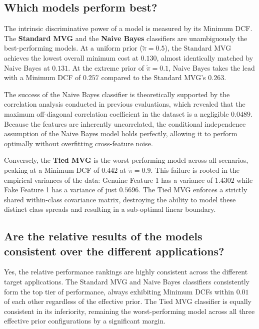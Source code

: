 \subsection*{Which models perform best?}

The intrinsic discriminative power of a model is measured by its Minimum DCF. The \textbf{Standard MVG} and the \textbf{Naive Bayes} classifiers are unambiguously the best-performing models. At a uniform prior ($\tilde{\pi} = 0.5$), the Standard MVG achieves the lowest overall minimum cost at $0.130$, almost identically matched by Naive Bayes at $0.131$. At the extreme prior of $\tilde{\pi} = 0.1$, Naive Bayes takes the lead with a Minimum DCF of $0.257$ compared to the Standard MVG's $0.263$. 

The success of the Naive Bayes classifier is theoretically supported by the correlation analysis conducted in previous evaluations, which revealed that the maximum off-diagonal correlation coefficient in the dataset is a negligible $0.0489$. Because the features are inherently uncorrelated, the conditional independence assumption of the Naive Bayes model holds perfectly, allowing it to perform optimally without overfitting cross-feature noise.

Conversely, the \textbf{Tied MVG} is the worst-performing model across all scenarios, peaking at a Minimum DCF of $0.442$ at $\tilde{\pi} = 0.9$. This failure is rooted in the empirical variances of the data: Genuine Feature 1 has a variance of $1.4302$ while Fake Feature 1 has a variance of just $0.5696$. The Tied MVG enforces a strictly shared within-class covariance matrix, destroying the ability to model these distinct class spreads and resulting in a sub-optimal linear boundary.

\subsection*{Are the relative results of the models consistent over the different applications?}

Yes, the relative performance rankings are highly consistent across the different target applications. The Standard MVG and Naive Bayes classifiers consistently form the top tier of performance, always exhibiting Minimum DCFs within $0.01$ of each other regardless of the effective prior. The Tied MVG classifier is equally consistent in its inferiority, remaining the worst-performing model across all three effective prior configurations by a significant margin. 

